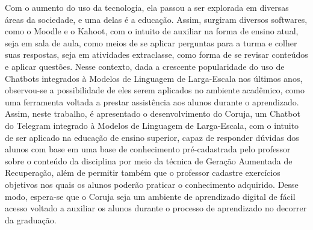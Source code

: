 Com o aumento do uso da tecnologia, ela passou a ser explorada em diversas áreas da sociedade, e uma delas é a educação. Assim, surgiram diversos softwares, como o Moodle e o Kahoot, com o intuito de auxiliar na forma de ensino atual, seja em sala de aula, como meios de se aplicar perguntas para a turma e colher suas respostas, seja em atividades extraclasse, como forma de se revisar conteúdos e aplicar questões. Nesse contexto, dada a crescente popularidade do uso de Chatbots integrados à Modelos de Linguagem de Larga-Escala nos últimos anos, observou-se a possibilidade de eles serem aplicados no ambiente acadêmico, como uma ferramenta voltada a prestar assistência aos alunos durante o aprendizado. Assim, neste trabalho, é apresentado o desenvolvimento do Coruja, um Chatbot do Telegram integrado à Modelos de Linguagem de Larga-Escala, com o intuito de ser aplicado na educação de ensino superior, capaz de responder dúvidas dos alunos com base em uma base de conhecimento pré-cadastrada pelo professor sobre o conteúdo da disciplina por meio da técnica de Geração Aumentada de Recuperação, além de permitir também que o professor cadastre exercícios objetivos nos quais os alunos poderão praticar o conhecimento adquirido. Desse modo, espera-se que o Coruja seja um ambiente de aprendizado digital de fácil acesso voltado a auxiliar os alunos durante o processo de aprendizado no decorrer da graduação.

